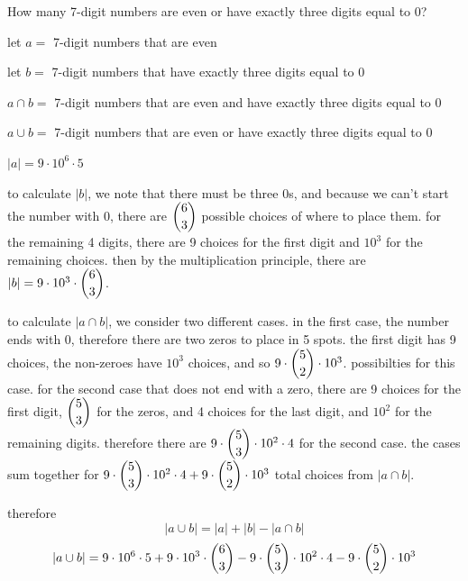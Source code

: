 \documentclass[openany, 11pt]{book}
\begin{document}
\begin{exercise}{}{}
	How many 7-digit numbers are even or have exactly three digits equal to 0?
	\begin{alist}
		\item let $a=$ 7-digit numbers that are even
		\item let $b=$ 7-digit numbers that have exactly three digits equal to 0
		\item $a\cap b=$ 7-digit numbers that are even and have exactly three digits equal to 0
		\item $a\cup b=$ 7-digit numbers that are even or have exactly three digits equal to 0
		\item $|a|=9\cdot10^6\cdot5$
		\item to calculate $|b|$, we note that there must be three 0s, and because we
		can't start the number with 0, there are $\dbinom{6}{3}$ possible choices of
		where to place them. for the remaining 4 digits, there are
		9 choices for the first digit and $10^3$ for the remaining choices. then by the multiplication principle, there are
		$|b|=9\cdot10^3\cdot \dbinom{6}{3}$.
		\item to calculate $|a\cap b|$, we consider two different cases. in the first
		case, the number ends with 0, therefore there are two zeros to place in 5
		spots. the first digit has 9 choices, the non-zeroes have $10^3$ choices,
		and so $9\cdot\dbinom{5}{2}\cdot10^3$. possibilties for this case. for the
		second case that does not end with a zero, there are 9 choices for the
		first digit, $\dbinom{5}{3}$ for the zeros, and 4 choices for the last
		digit, and $10^2$ for the remaining digits. therefore there are
		$9\cdot\dbinom{5}{3}\cdot10^2\cdot4$ for the second case. the cases sum together for
		$9\cdot\dbinom{5}{3}\cdot10^2\cdot4 +
			9\cdot\dbinom{5}{2}\cdot10^3$ total choices from $|a\cap b|$.
		\item therefore
		$$|a \cup b | = |a| + |b| - |a \cap b|$$
		$$|a \cup b | =
			9\cdot10^6\cdot5 + 9\cdot10^3\cdot \dbinom{6}{3} - 9\cdot\dbinom{5}{3}\cdot10^2\cdot4 - 9\cdot\dbinom{5}{2}\cdot10^3$$
	\end{alist}
\end{exercise}
\end{document}
